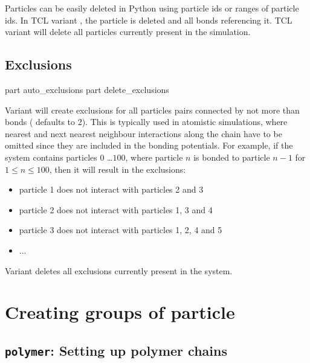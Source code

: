 Particles can be easily deleted in Python using particle ids or 
ranges of particle ids. In TCL variant , the particle  
is deleted and all bonds referencing it. TCL variant  will delete all
particles currently present in the simulation.

\subsection{Exclusions}

\begin{essyntax}
   part auto\_exclusions 
   part delete\_exclusions
  \begin{features}
  \end{features}
\end{essyntax}


Variant  will create exclusions for all particles pairs
connected by not more than  bonds ( defaults to
2). This is typically used in atomistic simulations, where nearest and
next nearest neighbour interactions along the chain have to be omitted
since they are included in the bonding potentials. For example, if the
system contains particles $0$ \dots $100$, where particle $n$ is
bonded to particle $n-1$ for $1 \leq n \leq 100$, then it will result
in the exclusions:
\begin{itemize}
  \item particle 1 does not interact with particles 2 and 3
  \item particle 2 does not interact with particles 1, 3 and 4
  \item particle 3 does not interact with particles 1, 2, 4 and 5
  \item ...
\end{itemize}

Variant  deletes all exclusions currently present in the
system.

\section{Creating groups of particle}

\subsection{\texttt{polymer}: Setting up polymer chains}

